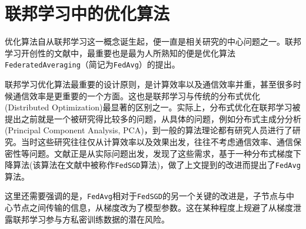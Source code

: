 \section{联邦学习中的优化算法}
\label{sec:chap2-overview}

优化算法自从联邦学习这一概念诞生起，便一直是相关研究的中心问题之一。联邦学习开创性的文献\parencite{mcmahan2017fed_avg}中，最重要也是最为人所熟知的便是优化算法\texttt{FederatedAveraging}（简记为\texttt{FedAvg}）的提出。

联邦学习优化算法最重要的设计原则，是计算效率以及通信效率并重，甚至很多时候通信效率是更重要的一个方面。这也是联邦学习与传统的分布式优化(Distributed Optimization)最显著的区别之一。实际上，分布式优化在联邦学习被提出之前就是一个被研究得比较多的问题，从具体的问题，例如分布式主成分分析(Principal Component Analysis, PCA)\cite{dist_pca_2014_nips}，到一般的算法理论\cite{boyd2011distributed}都有研究人员进行了研究。当时这些研究往往仅从计算效率以及效果出发，往往不考虑通信效率、通信保密性等问题。文献\parencite{mcmahan2017fed_avg}正是从实际问题出发，发现了这些需求，基于一种分布式梯度下降算法\cite{chen2016_revisit}(该算法在文献\parencite{mcmahan2017fed_avg}中被称作\texttt{FedSGD}算法)，做了上文提到的改进而提出了\texttt{FedAvg}算法。

这里还需要强调的是，\texttt{FedAvg}相对于\texttt{FedSGD}的另一个关键的改进是，子节点与中心节点之间传输的信息，从梯度改为了模型参数。这在某种程度上规避了从梯度泄露联邦学习参与方私密训练数据\cite{zhu2019deep_leakage}的潜在风险。

